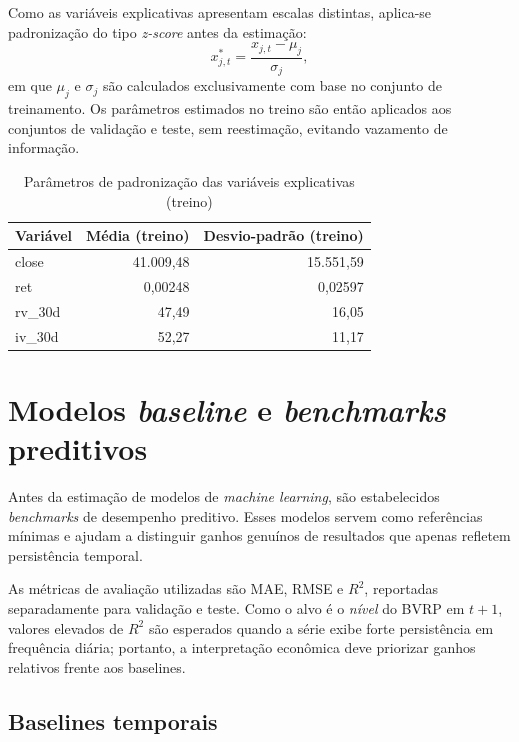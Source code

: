 Como as variáveis explicativas apresentam escalas distintas, aplica-se padronização
do tipo \textit{z-score} antes da estimação:
\begin{equation}
x^{\ast}_{j,t} = \frac{x_{j,t} - \mu_j}{\sigma_j},
\end{equation}
em que $\mu_j$ e $\sigma_j$ são calculados exclusivamente com base no conjunto de
treinamento. Os parâmetros estimados no treino são então aplicados aos conjuntos de
validação e teste, sem reestimação, evitando vazamento de informação.

\begin{table}[H]
\centering
\caption{Parâmetros de padronização das variáveis explicativas (treino)}
\label{tab:cap6_scaler_stats}
\footnotesize
\begin{tabular}{lrr}
\toprule
Variável & Média (treino) & Desvio-padrão (treino) \\
\midrule
close   & 41.009{,}48 & 15.551{,}59 \\
ret     & 0{,}00248   & 0{,}02597   \\
rv\_30d & 47{,}49     & 16{,}05     \\
iv\_30d & 52{,}27     & 11{,}17     \\
\bottomrule
\end{tabular}
\end{table}

\section{Modelos \textit{baseline} e \textit{benchmarks} preditivos}
\label{sec:cap6_baselines}

Antes da estimação de modelos de \textit{machine learning}, são estabelecidos
\textit{benchmarks} de desempenho preditivo. Esses modelos servem como referências
mínimas e ajudam a distinguir ganhos genuínos de resultados que apenas refletem
persistência temporal.

As métricas de avaliação utilizadas são MAE, RMSE e $R^2$, reportadas
separadamente para validação e teste. Como o alvo é o \textit{nível} do BVRP em
$t+1$, valores elevados de $R^2$ são esperados quando a série exibe forte
persistência em frequência diária; portanto, a interpretação econômica deve
priorizar ganhos relativos frente aos baselines.

\subsection{Baselines temporais}
\label{subsec:cap6_baselines_temporais}

